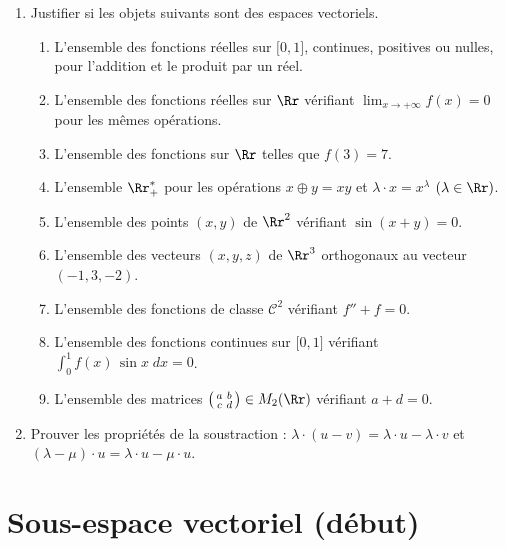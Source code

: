 \documentclass[class=report,crop=false]{standalone}
\begin{document}

\begin{miniexercices}
\sauteligne
\begin{enumerate}
  \item  Justifier si les objets suivants sont des espaces vectoriels.
  \begin{enumerate}
    \item L'ensemble des fonctions réelles sur
$\lbrack 0,1 \rbrack$, continues, positives ou nulles, pour
l'addition et le produit par un réel.
    \item L'ensemble des fonctions réelles sur $\Rr$ vérifiant
$\lim_{x \to+\infty} f(x)=0$ pour les mêmes opérations.
    \item L'ensemble des fonctions sur $\Rr$ telles que $f(3)=7$.
    \item L'ensemble $\Rr_+^*$ pour les opérations $x \oplus y=xy$ et
$\lambda\cdot x=x^{\lambda}$ $(\lambda\in \Rr)$.
    \item L'ensemble des points $(x,y)$ de $\Rr^2$ vérifiant
$\sin(x+y)=0$.
    \item L'ensemble des vecteurs $(x,y,z)$ de $\Rr^3$ orthogonaux
au vecteur $(-1,3,-2)$.
    \item L'ensemble des fonctions de classe $\mathcal{C}^2$ vérifiant $f''+f=0$.
    \item L'ensemble des fonctions continues sur $\lbrack0,1 \rbrack$
vérifiant $\int_0^1f(x) \, \sin x \; dx=0$.
    \item L'ensemble des matrices
    $\left(\begin{smallmatrix} a & b \\ c & d \end {smallmatrix}\right) \in M_{2}(\Rr)$ vérifiant $a+d=0$.
    \end{enumerate}

  \item Prouver les propriétés de la soustraction :
 $\lambda \cdot (u-v)=\lambda \cdot u -\lambda \cdot  v$  et $(\lambda -\mu) \cdot u=\lambda \cdot u-\mu \cdot u$.
\end{enumerate}
\end{miniexercices}

\section{Sous-espace vectoriel (début)}
\end{document}
